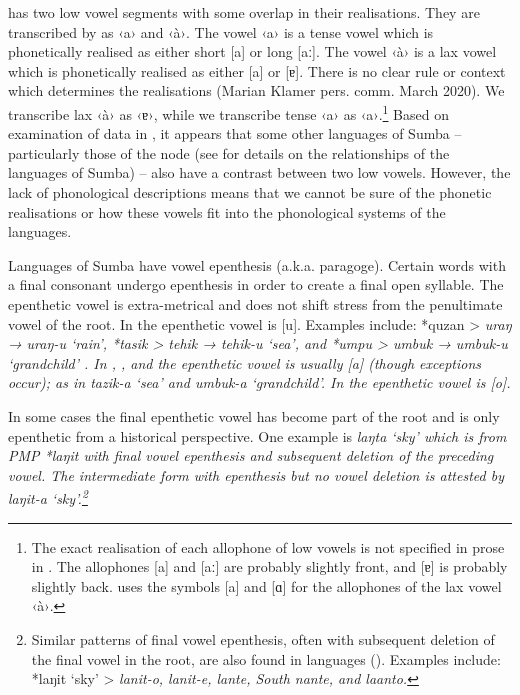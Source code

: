  has two low vowel segments with some overlap in their realisations.
They are transcribed by \citet{Klamer1998a} as ‹a› and ‹à›.
The vowel ‹a› is a tense vowel which is phonetically realised
as either short [a] or long [aː].
The vowel ‹à› is a lax vowel which is phonetically realised
as either [a] or [ɐ].
There is no clear rule or context which determines the realisations
(Marian Klamer pers. comm. March 2020).
We transcribe lax ‹à› as ‹ɐ›,
while we transcribe tense ‹a› as ‹a›.\footnote{
		The exact realisation of each allophone of  low vowels
		is not specified in prose in \citet{Klamer1998a}.
		The allophones [a] and [aː] are probably slightly front,
		and [ɐ] is probably slightly back.
		\citet[23]{Klamer1998a} uses the symbols [a]
		and [ɑ] for the allophones of the lax vowel ‹à›.}
Based on examination of data in \citet{Onvlee1984},
it appears that some other languages of Sumba -- particularly
those of the  node (see  for
details on the relationships of the languages of Sumba) -- also
have a contrast between two low vowels.
However, the lack of phonological descriptions means that we
cannot be sure of the phonetic realisations or how these vowels
fit into the phonological systems of the languages.

Languages of Sumba have vowel epenthesis (a.k.a. paragoge).
Certain words with a final consonant undergo epenthesis in order
to create a final open syllable.
The epenthetic vowel is extra-metrical
and does not shift stress from the penultimate vowel of the root.
In  the epenthetic vowel is [u].
Examples include: *quzan > \it{uraŋ → uraŋ-u} ‘rain’,
*tasik > \it{tehik → tehik-u} ‘sea’,
and *umpu > \it{umbuk → umbuk-u} ‘grandchild’ \citep[19]{Klamer1998a}.
In , , and  the epenthetic vowel is usually
[a] (though exceptions occur); as in  \it{tazik-a} ‘sea’
and  \it{umbuk-a} ‘grandchild’.
In  the epenthetic vowel is [o].

In some cases the final epenthetic vowel has become part of the
root and is only epenthetic from a historical perspective.
One example is  \it{laŋta} ‘sky’ which is from PMP *laŋit
with final vowel epenthesis
and subsequent deletion of the preceding vowel.
The intermediate form with epenthesis
but no vowel deletion
is attested by  \it{laŋit-a} ‘sky’.\footnote{
		Similar patterns
		of final vowel epenthesis,
		often with subsequent deletion of the final vowel in the root,
		are also found in  languages ().
		Examples include: *laŋit ‘sky’ >  \it{lanit-o},
		 \it{lanit-e},  \it{lante},
		South  \it{nante}, and  \it{laanto}.}

